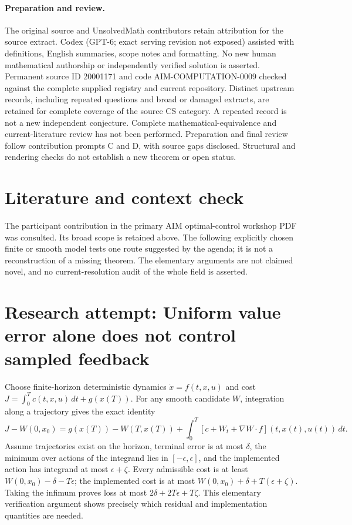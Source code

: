 \documentclass[11pt]{article}
\begin{document}
\paragraph{Preparation and review.}
The original source and UnsolvedMath contributors retain attribution for the source extract. Codex (GPT-6; exact serving revision not exposed) assisted with definitions, English summaries, scope notes and formatting. No new human mathematical authorship or independently verified solution is asserted. Permanent source ID 20001171 and code AIM-COMPUTATION-0009 checked against the complete supplied registry and current repository. Distinct upstream records, including repeated questions and broad or damaged extracts, are retained for complete coverage of the source CS category. A repeated record is not a new independent conjecture. Complete mathematical-equivalence and current-literature review has not been performed. Preparation and final review follow contribution prompts C and D, with source gaps disclosed. Structural and rendering checks do not establish a new theorem or open status.
\label{end:20001171}

\section{Literature and context check}
The participant contribution in the primary AIM optimal-control workshop
 PDF was consulted. Its broad scope is retained above. The following explicitly
 chosen finite or smooth model tests one route suggested by the agenda; it is
 not a reconstruction of a missing theorem. The elementary arguments are not
 claimed novel, and no current-resolution audit of the whole field is asserted.
\section{Research attempt: Uniform value error alone does not control sampled feedback}
Choose finite-horizon deterministic dynamics $\dot x=f(t,x,u)$ and cost
$J=\int_0^T c(t,x,u)\,dt+g(x(T))$. For any smooth candidate $W$, integration
along a trajectory gives the exact identity
\[
 J-W(0,x_0)=g(x(T))-W(T,x(T))+
 \int_0^T[c+W_t+\nabla W\cdot f](t,x(t),u(t))\,dt.
\]
Assume trajectories exist on the horizon, terminal error is at most $\delta$,
the minimum over actions of the integrand lies in $[-\epsilon,\epsilon]$,
and the implemented action has integrand at most $\epsilon+\zeta$.
Every admissible cost is at least $W(0,x_0)-\delta-T\epsilon$; the implemented
cost is at most $W(0,x_0)+\delta+T(\epsilon+\zeta)$. Taking the infimum
proves loss at most $2\delta+2T\epsilon+T\zeta$. This elementary verification
argument shows precisely which residual and implementation quantities are needed.
\end{document}
